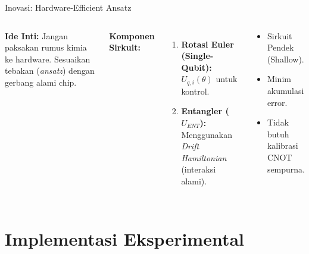 \documentclass[aspectratio=169, 10pt]{beamer}
\begin{document}
\begin{frame}{Inovasi: Hardware-Efficient Ansatz}
    \begin{columns}
        \textbf{Ide Inti:} Jangan paksakan rumus kimia ke hardware. Sesuaikan tebakan (\textit{ansatz}) dengan gerbang alami chip.
        
        \vspace{1em}
        \textbf{Komponen Sirkuit:}
        \begin{enumerate}
            \item \textbf{Rotasi Euler (Single-Qubit):} $U_{q,i}(\theta)$ untuk kontrol.
            \item \textbf{Entangler ($U_{ENT}$):} Menggunakan \textit{Drift Hamiltonian} (interaksi alami).
        \end{enumerate}
        
        \begin{tcolorbox}[title=Keunggulan]
            \begin{itemize}
                \item Sirkuit Pendek (Shallow).
                \item Minim akumulasi error.
                \item Tidak butuh kalibrasi CNOT sempurna.
            \end{itemize}
        \end{tcolorbox}
    \end{columns}
\end{frame}

\section{Implementasi Eksperimental}
\end{document}

